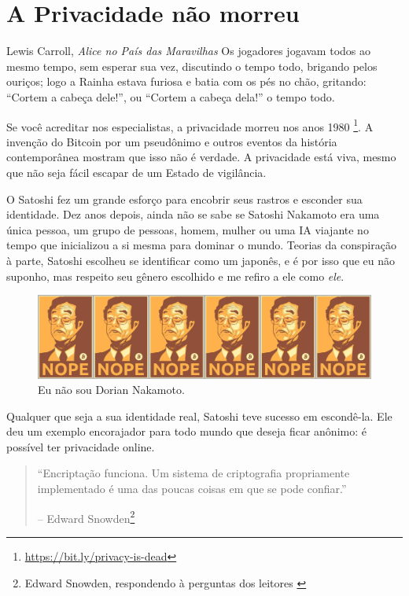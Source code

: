 \chapter{A Privacidade não morreu}
\label{les:19}

\begin{chapquote}{Lewis Carroll, \textit{Alice no País das Maravilhas}}
	Os jogadores jogavam todos ao mesmo tempo, sem esperar sua vez, discutindo o tempo todo, brigando pelos ouriços; logo a Rainha estava furiosa e batia com os pés no chão, gritando: \enquote{Cortem a cabeça dele!}, ou \enquote{Cortem a cabeça dela!} o tempo todo.
\end{chapquote}

Se você acreditar nos especialistas, a privacidade morreu nos anos 1980
\footnote{\url{https://bit.ly/privacy-is-dead}}. A invenção do Bitcoin por um 
pseudônimo e outros eventos da história contemporânea mostram que isso não é verdade.
A privacidade está viva, mesmo que não seja fácil escapar de um Estado de vigilância. 

O Satoshi fez um grande esforço para encobrir seus rastros e esconder sua identidade. Dez anos depois, ainda não se sabe se Satoshi Nakamoto era uma única pessoa, um grupo de pessoas, homem, mulher ou uma IA viajante no tempo que inicializou a si mesma para dominar o mundo. Teorias da conspiração à parte, Satoshi escolheu se identificar como um japonês, e é por isso que eu não suponho, mas respeito seu gênero escolhido e me refiro a ele como \textit{ele}. 

\begin{figure}
  \includegraphics{assets/images/nope.png}
  \caption{Eu não sou Dorian Nakamoto.}
  \label{fig:nope}
\end{figure}

Qualquer que seja a sua identidade real, Satoshi teve sucesso em escondê-la. 
Ele deu um exemplo encorajador para todo mundo que deseja ficar anônimo: 
é possível ter privacidade online.

\begin{quotation}\begin{samepage}
\enquote{Encriptação funciona. Um sistema de criptografia propriamente implementado é uma das poucas coisas em que se pode confiar.}
\begin{flushright} -- Edward Snowden\footnote{Edward Snowden, respondendo à perguntas dos leitores \cite{snowden}}
\end{flushright}\end{samepage}\end{quotation}

